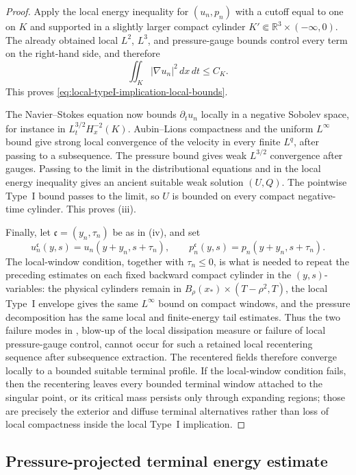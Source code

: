 \documentclass[11pt]{amsart}
\numberwithin{equation}{section}
\theoremstyle{plain}
\theoremstyle{definition}
\theoremstyle{remark}
\newcommand{\R}{\mathbb R}
\begin{document}
\begin{proof}
Apply the local energy inequality for \((u_n,p_n)\) with a cutoff equal to one
on \(K\) and supported in a slightly larger compact cylinder
\(K'\Subset\R^3\times(-\infty,0)\).  The already obtained local \(L^2\),
\(L^3\), and pressure-gauge bounds control every term on the right-hand side,
and therefore
\[
   \iint_K |\nabla u_n|^2\,dx\,dt\le C_K .
\]
This proves \eqref{eq:local-typeI-implication-local-bounds}.

The Navier--Stokes equation now bounds \(\partial_tu_n\) locally in a negative
Sobolev space, for instance in \(L^{3/2}_tH^{-2}_x(K)\).  Aubin--Lions
compactness and the uniform \(L^\infty\) bound give strong local convergence of
the velocity in every finite \(L^q\), after passing to a subsequence.  The
pressure bound gives weak \(L^{3/2}\) convergence after gauges.  Passing to the
limit in the distributional equations and in the local energy inequality gives
an ancient suitable weak solution \((U,Q)\).  The pointwise Type~I bound passes
to the limit, so \(U\) is bounded on every compact negative-time cylinder.
This proves (iii).

Finally, let \(\mathfrak c=(y_n,\tau_n)\) be as in (iv), and set
\[
   u_n^{\mathfrak c}(y,s)=u_n(y+y_n,s+\tau_n),
   \qquad
   p_n^{\mathfrak c}(y,s)=p_n(y+y_n,s+\tau_n).
\]
The local-window condition, together with \(\tau_n\le0\), is what is
needed to repeat the preceding estimates on each fixed backward compact cylinder
in the \((y,s)\)-variables: the
physical cylinders remain in \(B_\rho(x_*)\times(T-\rho^2,T)\), the local
Type~I envelope gives the same \(L^\infty\) bound on compact windows, and the
pressure decomposition has the same local and finite-energy tail estimates.
Thus the two failure modes in , blow-up of the
local dissipation measure or failure of local pressure-gauge control, cannot
occur for such a retained local recentering sequence after subsequence
extraction.  The recentered fields therefore converge locally to a bounded
suitable terminal profile.  If the local-window condition fails, then the
recentering leaves every bounded terminal window attached to the singular
point, or its critical mass persists only through expanding regions; those are
precisely the exterior and diffuse terminal alternatives rather than loss of
local compactness inside the local Type~I implication.
\end{proof}

\subsection{Pressure-projected terminal energy estimate}
\label{subsec:pressure-projected-terminal-estimate}
\end{document}
